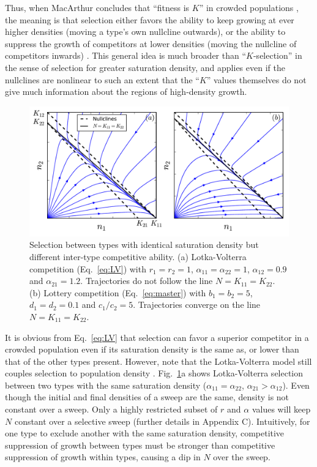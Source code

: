 \documentclass[11pt]{article}
\begin{document}
Thus, when MacArthur concludes that  ``fitness is $K$'' in crowded populations \citep[pp. 149]{macarthur_1967}, the meaning is that selection either favors the ability to keep growing at ever higher densities (moving a type's own nullcline outwards), or the ability to suppress the growth of competitors at lower densities (moving the nullcline of competitors inwards) \citep{gill_1974}. This general idea is much broader than ``$K$-selection'' in the sense of selection for greater saturation density, and applies even if the nullclines are nonlinear to such an extent that the ``$K$'' values themselves do not give much information about the regions of high-density growth.

\begin{figure}
\centering
\includegraphics[scale=0.8]{LVvslottery.pdf}
\caption{\label{fig:LVvslottery} Selection between types with identical saturation density but different inter-type competitive ability. (a) Lotka-Volterra competition (Eq.~\ref{eq:LV}) with $r_1=r_2=1$, $\alpha_{11}=\alpha_{22}=1$, $\alpha_{12}=0.9$ and $\alpha_{21}=1.2$. Trajectories do not follow the line $N=K_{11}=K_{22}$. (b) Lottery competition (Eq.~\ref{eq:master}) with $b_1=b_2=5$, $d_1=d_2=0.1$ and $c_1/c_2=5$. Trajectories converge on the line $N=K_{11}=K_{22}$.}
\end{figure}

It is obvious from Eq.~\eqref{eq:LV} that selection can favor a superior competitor in a crowded population even if its saturation density is the same as, or lower than that of the other types present. However, note that the Lotka-Volterra model still couples selection to population density \citep{smouse_1976}. Fig.~\ref{fig:LVvslottery}a shows Lotka-Volterra selection between two types with the same saturation density ($\alpha_{11}=\alpha_{22}$, $\alpha_{21}>\alpha_{12}$). Even though the initial and final densities of a sweep are the same, density is not constant over a sweep. Only a highly restricted subset of $r$ and $\alpha$ values will keep $N$ constant over a selective sweep (further details in Appendix C). Intuitively, for one type to exclude another with the same saturation density, competitive suppression of growth between types must be stronger than competitive suppression of growth within types, causing a dip in $N$ over the sweep. 
\end{document}
